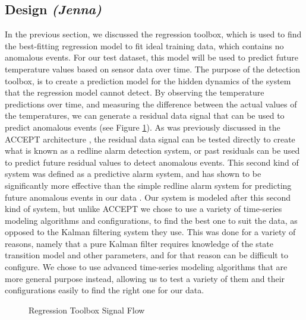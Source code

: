 \documentclass{acm_proc_article-sp}
\begin{document}
\subsection{Design \textit{(Jenna)}}

In the previous section, we discussed the regression toolbox, which is used to find the best-fitting regression model to fit ideal training data, which contains no anomalous events. For our test dataset, this model will be used to predict future temperature values based on sensor data over time. The purpose of the detection toolbox, is to create a prediction model for the hidden dynamics of the system that the regression model cannot detect. By observing the temperature predictions over time, and measuring the difference between the actual values of the temperatures, we can generate a residual data signal that can be used to predict anomalous events (see Figure \ref{fig:RegressionSignal}). As was previously discussed in the ACCEPT architecture \cite{accept}, the residual data signal can be tested directly to create what is known as a redline alarm detection system, or past residuals can be used to predict future residual values to detect anomalous events. This second kind of system was defined as a predictive alarm system, and has shown to be significantly more effective than the simple redline alarm system for predicting future anomalous events in our data \cite{Cornell}. Our system is modeled after this second kind of system, but unlike ACCEPT we chose to use a variety of time-series modeling algorithms and configurations, to find the best one to suit the data, as opposed to the Kalman filtering system they use. This was done for a variety of reasons, namely that a pure Kalman filter \cite{Kalman} requires knowledge of the state transition model and other parameters, and for that reason can be difficult to configure. We chose to use advanced time-series modeling algorithms that are more general purpose instead, allowing us to test a variety of them and their configurations easily to find the right one for our data.  

\begin{figure}[!h]
\centering
{}
\caption{Regression Toolbox Signal Flow}
\label{fig:RegressionSignal}
\end{figure}
\end{document}
